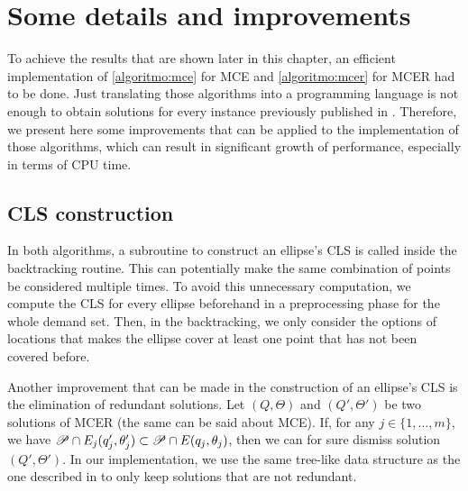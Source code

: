 


\section{Some details and improvements}\label{section:improvements}

To achieve the results that are shown later in this chapter, an efficient implementation of \autoref{algoritmo:mce} for MCE and \autoref{algoritmo:mcer} for MCER had to be done. Just translating those algorithms into a programming language is not enough to obtain solutions for every instance previously published in .
Therefore, we present here some improvements that can be applied to the implementation of those algorithms, which can result in significant growth of performance, especially in terms of CPU time.

\subsection{CLS construction}

In both algorithms, a subroutine to construct an ellipse's CLS is called inside the backtracking routine. This can potentially make the same combination of points be considered multiple times.
To avoid this unnecessary computation, we compute the CLS for every ellipse beforehand in a preprocessing phase for the whole demand set. Then, in the backtracking, we only consider the options of locations that makes the ellipse cover at least one point that has not been covered before.

Another improvement that can be made in the construction of an ellipse's CLS is the elimination of redundant solutions.
Let $(Q, \Theta)$ and $(Q', \Theta')$ be two solutions of MCER (the same can be said about MCE). If, for any $j \in \{1, \dots, m\}$, we have $\mathscr{P} \cap E_j(q_j', \theta_j') \subset \mathscr{P} \cap E(q_j, \theta_j)$, then we can for sure dismiss solution $(Q', \Theta')$.
In our implementation, we use the same tree-like data structure as the one described in  to only keep solutions that are not redundant.

